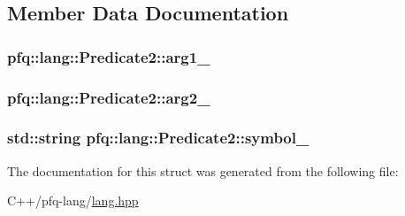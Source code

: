 \subsection{Member Data Documentation}
\hypertarget{structpfq_1_1lang_1_1Predicate2_a9d1bc0663b638551913871c35a7706a7}{
\subsubsection[{arg1\+\_\+}]{ pfq\+::lang\+::\+Predicate2\+::arg1\+\_\+}}\label{structpfq_1_1lang_1_1Predicate2_a9d1bc0663b638551913871c35a7706a7}
\hypertarget{structpfq_1_1lang_1_1Predicate2_aa25ff9d4aa934222dd808efd7320922c}{
\subsubsection[{arg2\+\_\+}]{ pfq\+::lang\+::\+Predicate2\+::arg2\+\_\+}}\label{structpfq_1_1lang_1_1Predicate2_aa25ff9d4aa934222dd808efd7320922c}
\hypertarget{structpfq_1_1lang_1_1Predicate2_ae6a811624aaa1b8ddc5998b42bab8618}{
\subsubsection[{symbol\+\_\+}]{\setlength{\rightskip}{0pt plus 5cm}std\+::string pfq\+::lang\+::\+Predicate2\+::symbol\+\_\+}}\label{structpfq_1_1lang_1_1Predicate2_ae6a811624aaa1b8ddc5998b42bab8618}


The documentation for this struct was generated from the following file\+:\begin{DoxyCompactItemize}
\item 
C++/pfq-\/lang/\hyperlink{lang_8hpp}{lang.\+hpp}\end{DoxyCompactItemize}
